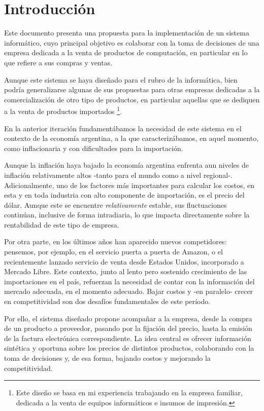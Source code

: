 \section{Introducción}

Este documento presenta una propuesta para la implementación 
de un sistema informático,
cuyo principal objetivo es colaborar con la toma de decisiones de una empresa
dedicada a la venta de productos de computación,
en particular en lo que refiere a sus compras y ventas.

Aunque este sistema se haya diseñado para el rubro de la informática,
bien podría generalizarse algunas de sus propuestas para otras empresas 
dedicadas a la comercialización de otro tipo de productos,
en particular aquellas que se dediquen a la venta de productos importados
\footnote{Este diseño se basa en mi experiencia trabajando en la empresa familiar, 
dedicada a la venta de equipos informáticos e insumos de impresión.}.

En la anterior iteración fundamentábamos la necesidad de este sistema 
en el contexto de la economía argentina,
a la que caracterizábamos, 
en aquel momento, 
como inflacionaria 
y con dificultades para la importación.

Aunque la inflación haya bajado 
la economía argentina enfrenta aun niveles de inflación relativamente altos
-tanto para el mundo como a nivel regional-.
Adicionalmente,
uno de los factores más importantes para calcular los costos,
en esta y en toda industria con alto componente de importación,
es el precio del dólar.
Aunque este se encuentre \textit{relativamente} estable,
sus fluctuaciones continúan, inclusive de forma intradiaria,
lo que impacta directamente sobre la rentabilidad de este tipo de empresa.

Por otra parte,
en los últimos años han aparecido nuevos competidores:
pensemos, por ejemplo, en el servicio puerta a puerta de Amazon,
o el recientemente lanzado servicio de venta desde Estados Unidos,
incorporado a Mercado Libre.
Este contexto, junto al lento pero sostenido crecimiento de las importaciones 
en el país,
refuerzan la necesidad de contar con la información del mercado adecuada,
en el momento adecuado.
Bajar costos y 
-en paralelo- crecer en competitividad son dos desafíos 
fundamentales de este período.

Por ello, 
el sistema diseñado propone acompañar a la empresa,
desde la compra de un producto a proveedor,
pasando por la fijación del precio,
hasta la emisión de la factura electrónica correspondiente.
La idea central es ofrecer información sintética y oportuna 
sobre los precios de distintos productos,
colaborando con la toma de decisiones y,
de esa forma,
bajando costos y mejorando la competitividad.

